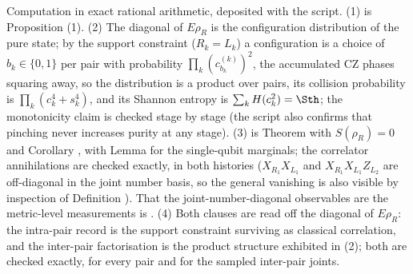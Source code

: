 Computation in exact rational arithmetic, deposited with the script. (1) is Proposition (1). (2) The diagonal of $E\rho_R$ is the configuration distribution of the pure state; by the support constraint ($R_k = L_k$) a configuration is a choice of $b_k \in \{0,1\}$ per pair with probability $\prod_k (c^{(k)}_{b_k})^2$, the accumulated CZ phases squaring away, so the distribution is a product over pairs, its collision probability is $\prod_k (c_k^4 + s_k^4)$, and its Shannon entropy is $\sum_k H(c_k^2) = \Sth$; the monotonicity claim is checked stage by stage (the script also confirms that pinching never increases purity at any stage). (3) is Theorem  with $S(\rho_R) = 0$ and Corollary , with Lemma  for the single-qubit marginals; the correlator annihilations are checked exactly, in both histories ($X_{R_1}X_{L_1}$ and $X_{R_1}X_{L_1}Z_{L_2}$ are off-diagonal in the joint number basis, so the general vanishing is also visible by inspection of Definition ). That the joint-number-diagonal observables are the metric-level measurements is . (4) Both clauses are read off the diagonal of $E\rho_R$: the intra-pair record is the support constraint surviving as classical correlation, and the inter-pair factorisation is the product structure exhibited in (2); both are checked exactly, for every pair and for the sampled inter-pair joints.
